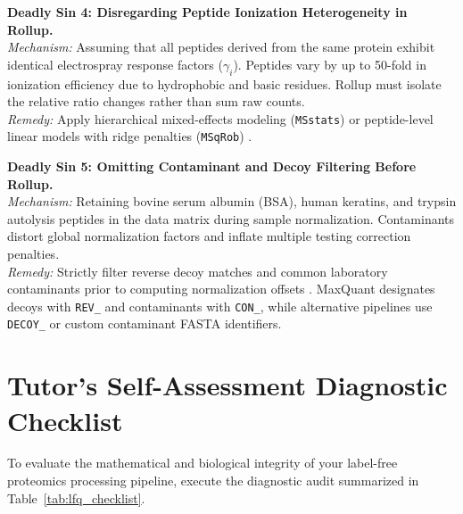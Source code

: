 \documentclass[11pt,oneside]{book}
\begin{document}
\begin{pitfallbox}[top=4pt, bottom=4pt, before skip=3pt, after skip=3pt]
\textbf{Deadly Sin 4: Disregarding Peptide Ionization Heterogeneity in Rollup.}\\
\textit{Mechanism:} Assuming that all peptides derived from the same protein exhibit identical electrospray response factors ($\gamma_i$). Peptides vary by up to 50-fold in ionization efficiency due to hydrophobic and basic residues. Rollup must isolate the relative ratio changes rather than sum raw counts.\\
\textit{Remedy:} Apply hierarchical mixed-effects modeling (\texttt{MSstats}) or peptide-level linear models with ridge penalties (\texttt{MSqRob}) \cite{choi2014msstats, goeminne2016msqrob2}.
\end{pitfallbox}

\begin{pitfallbox}[top=4pt, bottom=4pt, before skip=3pt, after skip=3pt]
\textbf{Deadly Sin 5: Omitting Contaminant and Decoy Filtering Before Rollup.}\\
\textit{Mechanism:} Retaining bovine serum albumin (BSA), human keratins, and trypsin autolysis peptides in the data matrix during sample normalization. Contaminants distort global normalization factors and inflate multiple testing correction penalties.\\
\textit{Remedy:} Strictly filter reverse decoy matches and common laboratory contaminants prior to computing normalization offsets \cite{cox2008maxquant}. MaxQuant designates decoys with \texttt{REV\_} and contaminants with \texttt{CON\_}, while alternative pipelines use \texttt{DECOY\_} or custom contaminant FASTA identifiers.
\end{pitfallbox}

\clearpage
\section{Tutor's Self-Assessment Diagnostic Checklist}
\enlargethispage{2.5\baselineskip}

To evaluate the mathematical and biological integrity of your label-free proteomics processing pipeline, execute the diagnostic audit summarized in Table~\ref{tab:lfq_checklist}.
\end{document}
